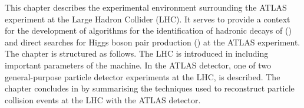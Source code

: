 This chapter describes the experimental environment surrounding the ATLAS
experiment at the Large Hadron Collider (LHC). It serves to provide a context
for the development of algorithms for the identification of hadronic decays of
\tauleptons () and direct searches for Higgs boson pair
production () at the ATLAS
experiment. The chapter is structured as follows. The LHC is introduced in
 including important parameters of the machine. In
 the ATLAS detector, one of two general-purpose particle
detector experiments at the LHC, is described. The chapter concludes in
 by summarising the techniques used to
reconstruct particle collision events at the LHC with the ATLAS detector.

